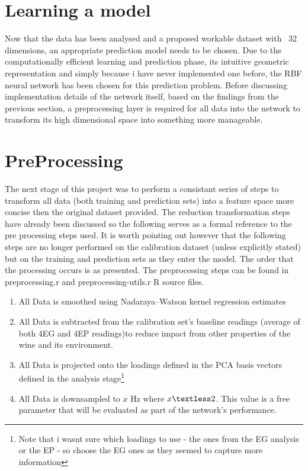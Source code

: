 \documentclass[twocolumn]{article}
\begin{document}
\section{Learning a model}
Now that the data has been analysed and a proposed workable dataset with ~32 dimensions, an appropriate prediction model needs to be chosen.
Due to the computationally efficient learning and prediction phase, its intuitive geometric representation and simply because i have never
implemented one before, the RBF neural network has been chosen for this prediction problem. Before discussing implementation details
of the network itself, based on the findings from the previous section, a preprocessing layer is required for all data into the network
to transform its high dimensional space into something more manageable. 
\section{PreProcessing}
The next stage of this project was to perform a consistant series of steps to transform all data (both training and prediction sets) into a
feature space more concise then the original dataset provided. The reduction transformation steps have already been discussed so the following
serves as a formal reference to the pre processing steps used. It is worth pointing out however that the following steps are no longer performed
on the calibration dataset (unless explicitly stated) but on the training and prediction sets as they enter the model. The order that the processing
occurs is as presented. The preprocessing steps can be found in preprocessing.r and preprocessing-utils.r R source files.

\begin{enumerate}
	\item All Data is smoothed using Nadaraya–Watson kernel regression estimates
	\item All Data is subtracted from the calibration set's baseline readings (average of both 4EG and 4EP readings)to reduce impact from 
		  other properties of the wine and its environment.
	\item All Data is projected onto the loadings defined in the PCA basis vectors defined in the analysis stage\footnote{Note that i wasnt
	      sure which loadings to use - the ones from the EG analysis or the EP - so choose the EG ones as they seemed to capture more information}
	\item All Data is downsampled to $x$ Hz where $x \textless 2$. This value is a free parameter that will be evaluated as part of the network's performance.
	
\end{enumerate}
\end{document}
